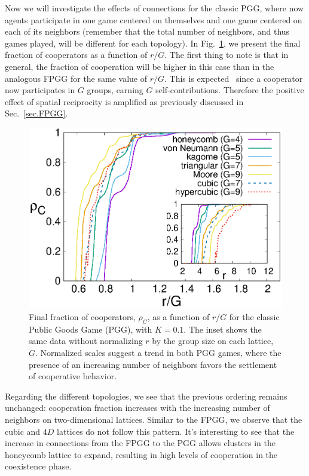 \documentclass[5p,review]{elsarticle}
\begin{document}
Now we will investigate the effects of connections for the classic PGG, where now agents participate in one game centered on themselves and one game centered on each of its neighbors (remember that the total number of neighbors, and thus games played, will be different for each topology). In Fig.~\ref{normpgg}, we present the final fraction of cooperators as a function of $r/G$.  
%
The first thing to note is that in general, the fraction of cooperation will be higher in this case than in the analogous FPGG for the same value of $r/G$.  
%
This is expected~\cite{szolnoki09} since a cooperator now participates in $G$ groups, earning  $G$ self-contributions. Therefore the positive effect of spatial reciprocity is amplified as previously discussed in Sec.~\ref{sec.FPGG}.
%
%
%
\begin{figure}[!t]
\centering
\includegraphics[width=\linewidth]{coopPGG.eps}
\caption{ Final fraction of cooperators, $\rho_C$, as a function of $r/G$ for the classic Public Goods Game (PGG), with $K=0.1$. The inset shows the same data without normalizing $r$ by the group size on each lattice, $G$.  Normalized scales suggest a trend in both PGG games, where the presence of an increasing number of neighbors favors the settlement of cooperative behavior.} 
\label{normpgg}
\end{figure}


Regarding the different topologies, we see that the previous ordering remains unchanged: cooperation fraction increases with the increasing number of neighbors on two-dimensional lattices. 
%
Similar to the FPGG, we observe that the cubic and $4D$ lattices do not follow this pattern. 
%
It's interesting to see that the increase in connections from the FPGG to the PGG allows clusters in the honeycomb lattice to expand, resulting in high levels of cooperation in the coexistence phase.
\end{document}
